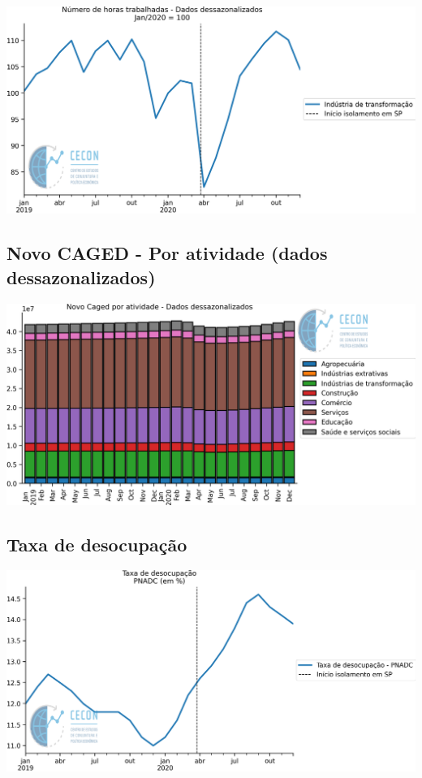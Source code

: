 \documentclass{SelfArx}
\begin{document}
\begin{center}
\includegraphics[width=.9\linewidth]{./figs/Emprego/Horas_Transformacao.png}
\end{center}

\subsection*{Novo CAGED  - Por atividade (dados dessazonalizados)}
\label{sec:org5d470bf}

\begin{center}
\includegraphics[width=.9\linewidth]{./figs/Emprego/NovoCaged_Atividade.png}
\end{center}



\subsection*{Taxa de desocupação}
\label{sec:org8ab2fdd}

\begin{center}
\includegraphics[width=.9\linewidth]{./figs/Emprego/TaxaDesocupacao.png}
\end{center}
\end{document}
